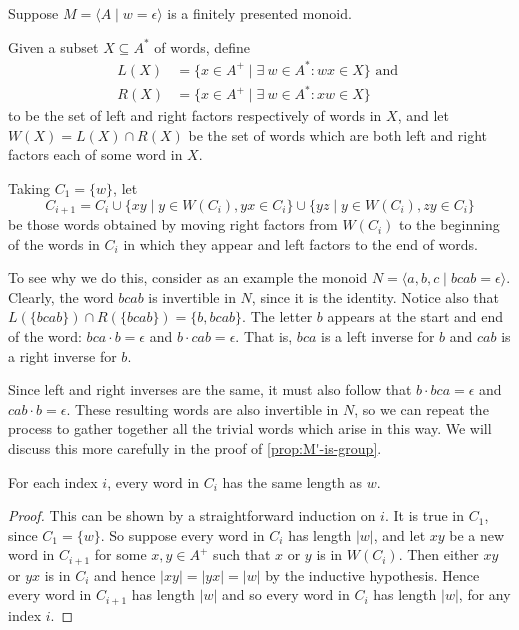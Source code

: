 \documentclass[noindex,noinsetproof,emphthm,12pt]{lmaths}
\begin{document}
Suppose $M = \langle A \mid w = \epsilon\rangle$ is a finitely presented monoid.

Given a subset $X \subseteq A^*$ of words, define
	\begin{align*}
		L(X) &= \{ x \in A^+ \mid \exists\ w \in A^* \colon wx \in X \} \text{ and } \\
		R(X) &= \{ x \in A^+ \mid \exists\ w \in A^* \colon xw \in X \}
	\end{align*}
to be the set of left and right factors respectively of words in $X$, and let $W(X) = L(X) \cap R(X)$ be the set of words which are both left and right factors each of some word in $X$.

Taking $C_1 = \{w\}$, let
	\[ C_{i+1} = C_i \cup \{ xy \mid y \in W(C_i), yx \in C_i \} \cup \{ yz \mid y \in W(C_i), zy \in C_i \} \]
be those words obtained by moving right factors from $W(C_i)$ to the beginning of the words in $C_i$ in which they appear and left factors to the end of words.

To see why we do this, consider as an example the monoid $N = \langle a, b, c \mid bcab = \epsilon \rangle$. Clearly, the word $bcab$ is invertible in $N$, since it is the identity. Notice also that $L(\{bcab\}) \cap R(\{bcab\}) = \{b, bcab\}$. The letter $b$ appears at the start and end of the word: $bca \cdot b = \epsilon$ and $b \cdot cab = \epsilon$. That is, $bca$ is a left inverse for $b$ and $cab$ is a right inverse for $b$.

Since left and right inverses are the same, it must also follow that $b \cdot bca = \epsilon$ and $cab \cdot b = \epsilon$. These resulting words are also invertible in $N$, so we can repeat the process to gather together all the trivial words which arise in this way. We will discuss this more carefully in the proof of \cref{prop:M'-is-group}.


\begin{lemma}
	For each index $i$, every word in $C_i$ has the same length as $w$. \label{lma:Ci-length-w}
\end{lemma}
\begin{proof}
	This can be shown by a straightforward induction on $i$. It is true in $C_1$, since $C_1 = \{w\}$. So suppose every word in $C_i$ has length $|w|$, and let $xy$ be a new word in $C_{i+1}$ for some $x, y \in A^+$ such that $x$ or $y$ is in $W(C_i)$. Then either $xy$ or $yx$ is in $C_i$ and hence $|xy| = |yx| = |w|$ by the inductive hypothesis. Hence every word in $C_{i+1}$ has length $|w|$ and so every word in $C_i$ has length $|w|$, for any index $i$.
\end{proof}
\end{document}
